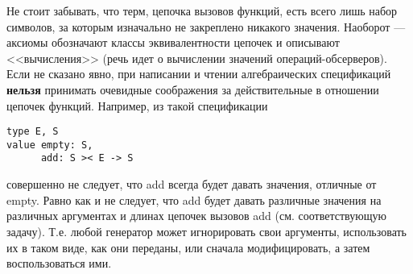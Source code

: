 Не стоит забывать, что терм, цепочка вызовов функций, есть всего лишь набор символов, за которым изначально не закреплено никакого значения. Наоборот --- аксиомы обозначают классы эквивалентности цепочек и описывают <<вычисления>> (речь идет о вычислении значений операций-обсерверов). Если не сказано явно, при написании и чтении алгебраических спецификаций \textbf{нельзя} принимать очевидные соображения за действительные в отношении цепочек функций. Например, из такой спецификации
\begin{lstlisting}
type E, S
value empty: S,
      add: S >< E -> S
\end{lstlisting}
совершенно не следует, что add всегда будет давать значения, отличные от empty. Равно как и не следует, что add будет давать различные значения на различных аргументах и длинах цепочек вызовов add (см. соответствующую задачу). Т.е. любой генератор может игнорировать свои аргументы, использовать их в таком виде, как они переданы, или сначала модифицировать, а затем воспользоваться ими.

